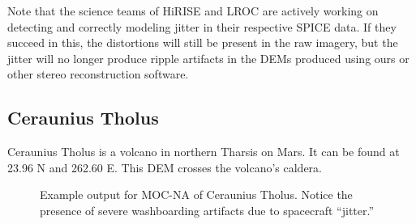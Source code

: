 Note that the science teams of \ac{HiRISE} and \ac{LROC} are actively
working on detecting and correctly modeling jitter in their respective
SPICE data. If they succeed in this, the distortions will still
be present in the raw imagery, but the jitter will no longer produce
ripple artifacts in the DEMs produced using ours or other stereo
reconstruction software.

\subsection{Ceraunius Tholus}

Ceraunius Tholus is a volcano in northern Tharsis on Mars. It can
be found at 23.96 N and 262.60 E. This \ac{DEM} crosses the volcano's
caldera.

\begin{figure}[h!]
\centering
  \hfil
\caption{Example output for MOC-NA of Ceraunius Tholus. Notice the presence of severe washboarding artifacts due to spacecraft ``jitter.''}
\label{fig:mocna_ceraunius_example}
\end{figure}

